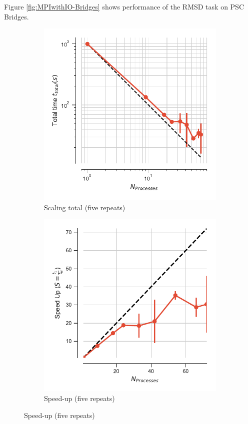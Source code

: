 \label{sec:supplement}

Figure \ref{fig:MPIwithIO-Bridges} shows performance of the RMSD task on PSC Bridges. 

\begin{figure}[ht!]
\centering
\begin{subfigure}{.4\textwidth}
  \includegraphics[width=\linewidth]{figures/main-RMSD-t_total-Bridges.pdf}
  \caption{Scaling total (five repeats)}
  \label{fig:MPIscaling-Bridges}
\end{subfigure}
\hfill
\begin{subfigure}{.4\textwidth}
  \includegraphics[width=\linewidth]{figures/main-RMSD-speed_up-Bridges.pdf}
  \caption{Speed-up (five repeats)}
  \label{fig:MPIspeedup-Bridges}
\end{subfigure}
\bigskip


\end{figure}
